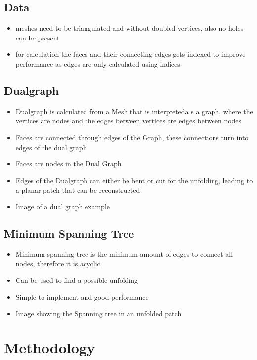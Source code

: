 \documentclass[draft,final]{vutinfth} %
\begin{document}
\section{Data}

\begin{itemize}
	\item meshes need to be triangulated and without doubled vertices, also no holes can be present
	\item for calculation the faces and their connecting edges gets indexed to improve performance as edges are only calculated using indices
\end{itemize}

\section{Dualgraph}

\begin{itemize}
	\item Dualgraph is calculated from a Mesh that is interpreteda s a graph, where the vertices are nodes and the edges between vertices are edges between nodes
	\item Faces are connected through edges of the Graph, these connections turn into edges of the dual graph
	\item Faces are nodes in the Dual Graph
	\item Edges of the Dualgraph can either be bent or cut for the unfolding, leading to a planar patch that can be reconstructed
	\item Image of a dual graph example
\end{itemize}

\section{Minimum Spanning Tree}

\begin{itemize}
	\item Minimum spanning tree is the minimum amount of edges to connect all nodes, therefore it is acyclic
	\item Can be used to find a possible unfolding
	\item Simple to implement and good performance
	\item Image showing the Spanning tree in an unfolded patch
\end{itemize}

\chapter{Methodology}
\end{document}
